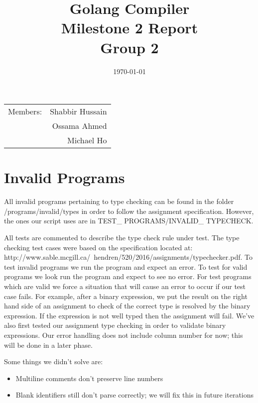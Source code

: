 \documentclass{article}
\title{Golang Compiler\\ Milestone 2 Report\\ Group 2} %
\date{\today} %
\begin{document}
\maketitle %

\begin{center}
\begin{tabular}{l r}
Members: & Shabbir Hussain \\ %
& Ossama Ahmed \\ %
& Michael Ho \\ \end{tabular}
\end{center}

\section{Invalid Programs}
All invalid programs pertaining to type checking can be found in the folder /programs/invalid/types in order to follow the assignment specification. However, the ones our script uses are in TEST\_ PROGRAMS/INVALID\_ TYPECHECK. 

All tests are commented to describe the type check rule under test. The type checking test cases were based on the specification located at: http://www.sable.mcgill.ca/~hendren/520/2016/assignments/typechecker.pdf. To test invalid programs we run the program and expect an error. To test for valid programs we look run the program and expect to see no error. For test programs which are valid we force a situation that will cause an error to occur if our test case fails. For example, after a binary expression, we put the result on the right hand side of an assignment to check of the correct type is resolved by the binary expression. If the expression is not well typed then the assignment will fail. We've also first tested our assignment type checking in order to validate binary expressions. Our error handling does not include column number for now; this will be done in a later phase.
	
Some things we didn't solve are:
\begin{itemize}
\item Multiline comments don't preserve line numbers
\item Blank identifiers still don't parse correctly; we will fix this in future iterations
\end{itemize}
\end{document}
